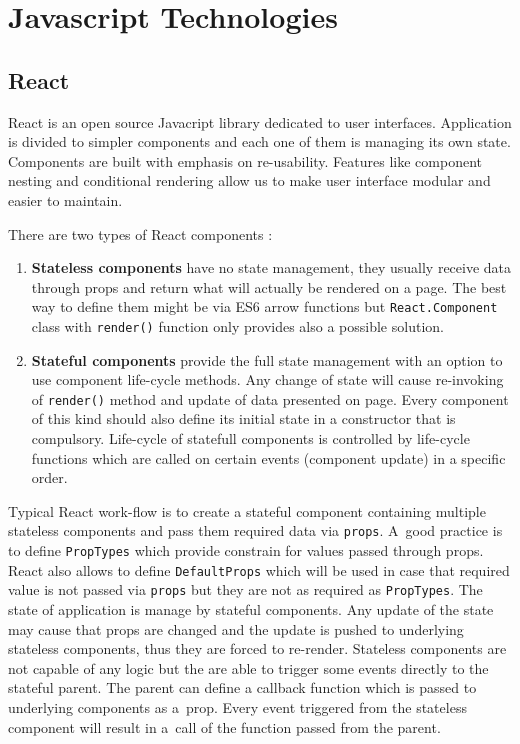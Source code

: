 \chapter{Javascript Technologies}

\section{React}
React is an open source Javacript library dedicated to user interfaces. Application is divided to simpler components and each one of them is managing its own state. Components are built with emphasis on re-usability. Features like component nesting and conditional rendering \cite{conditional} allow us to make user interface modular and easier to maintain.

There are two types of React components \cite{React}:
\begin{enumerate}
\item \textbf{Stateless components} have no state management, they usually receive data through props and return what will actually be rendered on a page. The best way to define them might be via ES6 arrow functions \cite{arrowFunctions} but \texttt{React.Component} class with \texttt{render()} function only provides also a possible solution.

\item \textbf{Stateful components} provide the full state management with an option to use component life-cycle methods. Any change of state will cause re-invoking of \texttt{render()} method and update of data presented on page. Every component of this kind should also define its initial state in a constructor that is compulsory.
Life-cycle of statefull components is controlled by life-cycle functions which are called on certain events (component update) in a specific order.
\end{enumerate}

Typical React work-flow is to create a stateful component containing multiple stateless components and pass them required data via \texttt{props}. A~good practice is to define \texttt{PropTypes} which provide constrain for values passed through props. React also allows to define \texttt{DefaultProps} which will be used in case that required value is not passed via \texttt{props} but they are not as required as \texttt{PropTypes}. The state of application is manage by stateful components. Any update of the state may cause that props are changed and the update is pushed to underlying stateless components, thus they are forced to re-render. Stateless components are not capable of any logic but the are able to trigger some events directly to the stateful parent. The parent can define a callback function which is passed to underlying components as a~prop. Every event triggered from the stateless component will result in a~call of the function passed from the parent. 

